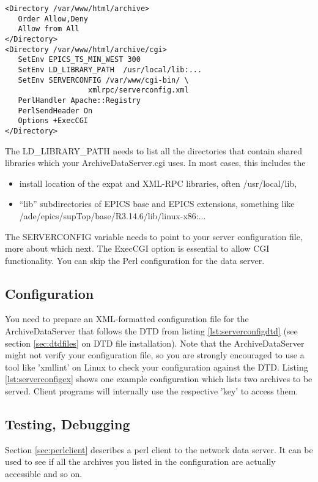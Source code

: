 \begin{enumerate}
\begin{lstlisting}[keywordstyle=\sffamily]
<Directory /var/www/html/archive>
   Order Allow,Deny
   Allow from All
</Directory>
<Directory /var/www/html/archive/cgi>
   SetEnv EPICS_TS_MIN_WEST 300
   SetEnv LD_LIBRARY_PATH  /usr/local/lib:...
   SetEnv SERVERCONFIG /var/www/cgi-bin/ \
                   xmlrpc/serverconfig.xml
   PerlHandler Apache::Registry
   PerlSendHeader On
   Options +ExecCGI
</Directory>
\end{lstlisting}
  The LD\_LIBRARY\_PATH needs to list all the directories that
  contain shared libraries which your ArchiveDataServer.cgi uses.
  In most cases, this includes the
  \begin{itemize}
  \item install location of the expat and XML-RPC
        libraries, often /usr/local/lib,
  \item ``lib'' subdirectories of EPICS base and EPICS extensions,
        something like /ade/epics/supTop/base/R3.14.6/lib/linux-x86:...
  \end{itemize}
  The SERVERCONFIG variable needs to point to your server configuration
  file, more about which next. The ExecCGI option is essential to
  allow CGI functionality. You can skip the Perl configuration for the
  data server.
\end{enumerate}

\subsection{Configuration}  %
You need to prepare an XML-formatted configuration file for the
ArchiveDataServer that follows the DTD from listing
\ref{lst:serverconfigdtd} (see section \ref{sec:dtdfiles} on DTD file
installation). Note that the ArchiveDataServer might not verify your
configuration file, so you are strongly encouraged to use a tool like
'xmllint' on Linux to check your configuration against the
DTD. Listing \ref{lst:serverconfigex} shows one example configuration
which lists two archives to be served. Client programs will internally
use the respective 'key' to access them.




\subsection{Testing, Debugging}  %
Section \ref{sec:perlclient} describes a perl client to the network
data server. It can be used to see if all the archives you listed
in the configuration are actually accessible and so on.

